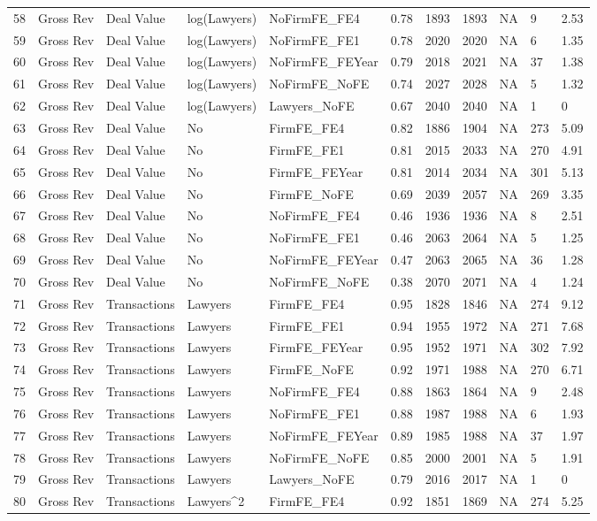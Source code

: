 \documentclass{article}
\begin{document}
\begin{table}[H]
\begin{tabular}{rllllllllll}
  58 & Gross Rev & Deal Value & log(Lawyers) & NoFirmFE\_FE4 & 0.78 & 1893 & 1893 & NA & 9 & 2.53 \\ 
  59 & Gross Rev & Deal Value & log(Lawyers) & NoFirmFE\_FE1 & 0.78 & 2020 & 2020 & NA & 6 & 1.35 \\ 
  60 & Gross Rev & Deal Value & log(Lawyers) & NoFirmFE\_FEYear & 0.79 & 2018 & 2021 & NA & 37 & 1.38 \\ 
  61 & Gross Rev & Deal Value & log(Lawyers) & NoFirmFE\_NoFE & 0.74 & 2027 & 2028 & NA & 5 & 1.32 \\ 
  62 & Gross Rev & Deal Value & log(Lawyers) & Lawyers\_NoFE & 0.67 & 2040 & 2040 & NA & 1 & 0 \\ 
  63 & Gross Rev & Deal Value & No & FirmFE\_FE4 & 0.82 & 1886 & 1904 & NA & 273 & 5.09 \\ 
  64 & Gross Rev & Deal Value & No & FirmFE\_FE1 & 0.81 & 2015 & 2033 & NA & 270 & 4.91 \\ 
  65 & Gross Rev & Deal Value & No & FirmFE\_FEYear & 0.81 & 2014 & 2034 & NA & 301 & 5.13 \\ 
  66 & Gross Rev & Deal Value & No & FirmFE\_NoFE & 0.69 & 2039 & 2057 & NA & 269 & 3.35 \\ 
  67 & Gross Rev & Deal Value & No & NoFirmFE\_FE4 & 0.46 & 1936 & 1936 & NA & 8 & 2.51 \\ 
  68 & Gross Rev & Deal Value & No & NoFirmFE\_FE1 & 0.46 & 2063 & 2064 & NA & 5 & 1.25 \\ 
  69 & Gross Rev & Deal Value & No & NoFirmFE\_FEYear & 0.47 & 2063 & 2065 & NA & 36 & 1.28 \\ 
  70 & Gross Rev & Deal Value & No & NoFirmFE\_NoFE & 0.38 & 2070 & 2071 & NA & 4 & 1.24 \\ 
  71 & Gross Rev & Transactions & Lawyers & FirmFE\_FE4 & 0.95 & 1828 & 1846 & NA & 274 & 9.12 \\ 
  72 & Gross Rev & Transactions & Lawyers & FirmFE\_FE1 & 0.94 & 1955 & 1972 & NA & 271 & 7.68 \\ 
  73 & Gross Rev & Transactions & Lawyers & FirmFE\_FEYear & 0.95 & 1952 & 1971 & NA & 302 & 7.92 \\ 
  74 & Gross Rev & Transactions & Lawyers & FirmFE\_NoFE & 0.92 & 1971 & 1988 & NA & 270 & 6.71 \\ 
  75 & Gross Rev & Transactions & Lawyers & NoFirmFE\_FE4 & 0.88 & 1863 & 1864 & NA & 9 & 2.48 \\ 
  76 & Gross Rev & Transactions & Lawyers & NoFirmFE\_FE1 & 0.88 & 1987 & 1988 & NA & 6 & 1.93 \\ 
  77 & Gross Rev & Transactions & Lawyers & NoFirmFE\_FEYear & 0.89 & 1985 & 1988 & NA & 37 & 1.97 \\ 
  78 & Gross Rev & Transactions & Lawyers & NoFirmFE\_NoFE & 0.85 & 2000 & 2001 & NA & 5 & 1.91 \\ 
  79 & Gross Rev & Transactions & Lawyers & Lawyers\_NoFE & 0.79 & 2016 & 2017 & NA & 1 & 0 \\ 
  80 & Gross Rev & Transactions & Lawyers^2 & FirmFE\_FE4 & 0.92 & 1851 & 1869 & NA & 274 & 5.25 \\ 
   \hline
\end{tabular}
\end{table}
\end{document}
